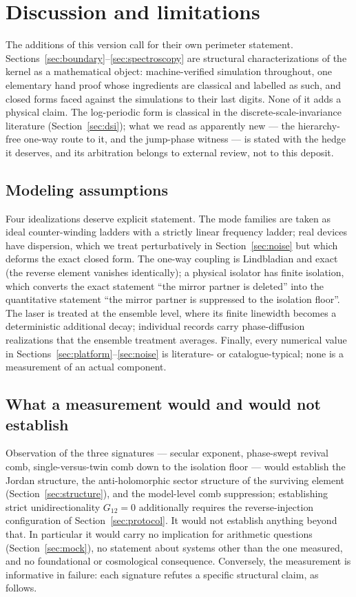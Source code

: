 \documentclass[11pt,a4paper]{article}
\begin{document}
\section{Discussion and limitations}
\label{sec:discussion}

The additions of this version call for their own perimeter statement.
Sections~\ref{sec:boundary}--\ref{sec:spectroscopy} are structural
characterizations of the kernel as a mathematical object: machine-verified
simulation throughout, one elementary hand proof whose ingredients are
classical and labelled as such, and closed forms faced against the
simulations to their last digits. None of it adds a physical claim. The
log-periodic form is classical in the discrete-scale-invariance literature
(Section~\ref{sec:dsi}); what we read as apparently new --- the
hierarchy-free one-way route to it, and the jump-phase witness --- is
stated with the hedge it deserves, and its arbitration belongs to external
review, not to this deposit.

\subsection{Modeling assumptions}

Four idealizations deserve explicit statement. The mode families are taken as
ideal counter-winding ladders with a strictly linear frequency ladder; real
devices have dispersion, which we treat perturbatively in
Section~\ref{sec:noise} but which deforms the exact closed form. The one-way
coupling is Lindbladian and exact (the reverse element vanishes identically); a
physical isolator has finite isolation, which converts the exact statement
``the mirror partner is deleted'' into the quantitative statement ``the mirror
partner is suppressed to the isolation floor''. The laser is treated at the
ensemble level, where its finite linewidth becomes a deterministic additional
decay; individual records carry phase-diffusion realizations that the ensemble
treatment averages. Finally, every numerical value in
Sections~\ref{sec:platform}--\ref{sec:noise} is literature- or
catalogue-typical; none is a measurement of an actual component.

\subsection{What a measurement would and would not establish}

Observation of the three signatures --- secular exponent, phase-swept revival
comb, single-versus-twin comb down to the isolation floor --- would establish
the Jordan structure, the anti-holomorphic sector structure of the surviving
element (Section~\ref{sec:structure}), and the model-level comb suppression;
establishing strict unidirectionality $G_{12} = 0$ additionally requires the
reverse-injection configuration of Section~\ref{sec:protocol}. It would not
establish anything beyond that. In
particular it would carry no implication for arithmetic questions
(Section~\ref{sec:mock}), no statement about systems other than the one
measured, and no foundational or cosmological consequence. Conversely, the
measurement is informative in failure: each signature refutes a specific
structural claim, as follows.
\end{document}
